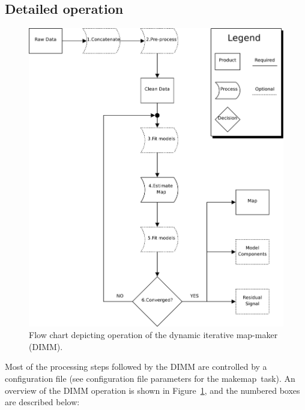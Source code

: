 \documentclass[twoside,11pt]{article}
\newcommand{\xref}[3]{#1}
\renewcommand{\_}{\texttt{\symbol{95}}}
\newcommand{\task}[1]{\textsf{#1}}
\newcommand{\makemap}{\xref{\task{makemap}}{sun258}{MAKEMAP}}
\begin{document}
\subsection{Detailed operation\label{se:dimmdetails}}

\begin{figure}
\begin{center}
\includegraphics[width=\linewidth]{sun258_dimm_flow}
\caption{Flow chart depicting operation of the dynamic iterative
  map-maker (DIMM).}
\label{fig:dimm_flow}
\end{center}
\end{figure}

Most of the processing steps followed by the DIMM are controlled by a
configuration file (see configuration file parameters for the
\makemap\ task). An overview of the DIMM operation is shown in
Figure~\ref{fig:dimm_flow}, and the numbered boxes are described
below:
\end{document}
